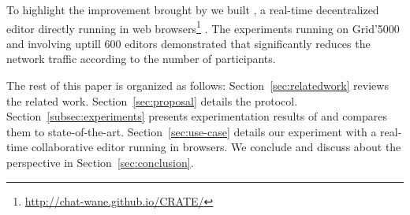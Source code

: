 To highlight the improvement brought by \SPRAY we built \CRATE, a
real-time decentralized editor directly running in web
browsers\footnote{\url{http://chat-wane.github.io/CRATE/}} . The experiments running on Grid'5000 and
involving uptill 600 editors demonstrated that \SPRAY significantly
reduces the network traffic according to the number of
participants. 

The rest of this paper is organized as follows:
Section~\ref{sec:relatedwork} reviews the related
work. Section~\ref{sec:proposal} details the \SPRAY
protocol. Section~\ref{subsec:experiments} presents experimentation
results of \SPRAY and compares them to
state-of-the-art. Section~\ref{sec:use-case} details our experiment
with \CRATE a real-time collaborative editor running in browsers. We
conclude and discuss about the perspective in
Section~\ref{sec:conclusion}.

